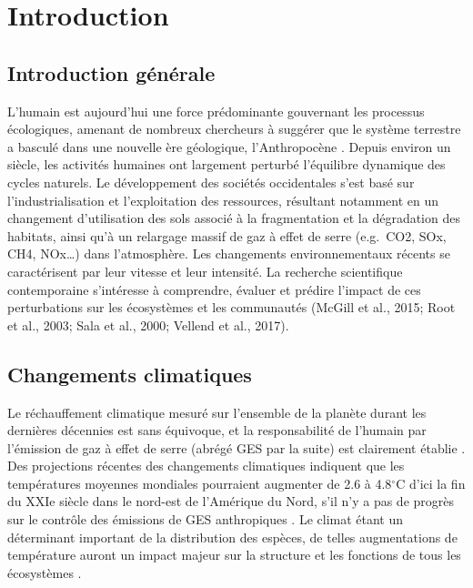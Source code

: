 \francais

\chapter*{Introduction}

\hypertarget{introduction-guxe9nuxe9rale}{%
\section{Introduction générale}\label{introduction-guxe9nuxe9rale}}

L'humain est aujourd'hui une force prédominante gouvernant les processus
écologiques, amenant de nombreux chercheurs à suggérer que le système
terrestre a basculé dans une nouvelle ère géologique, l'Anthropocène
\citep{crutzen_geology_2002}. Depuis environ un siècle, les activités
humaines ont largement perturbé l'équilibre dynamique des cycles
naturels. Le développement des sociétés occidentales s'est basé sur
l'industrialisation et l'exploitation des ressources, résultant
notamment en un changement d'utilisation des sols associé à la
fragmentation et la dégradation des habitats, ainsi qu'à un relargage
massif de gaz à effet de serre (e.g.~CO2, SOx, CH4, NOx\ldots) dans
l'atmosphère. Les changements environnementaux récents se caractérisent
par leur vitesse et leur intensité. La recherche scientifique
contemporaine s'intéresse à comprendre, évaluer et prédire l'impact de
ces perturbations sur les écosystèmes et les communautés (McGill et al.,
2015; Root et al., 2003; Sala et al., 2000; Vellend et al., 2017).

\hypertarget{changements-climatiques}{%
\section{Changements climatiques}\label{changements-climatiques}}

Le réchauffement climatique mesuré sur l'ensemble de la planète durant
les dernières décennies est sans équivoque, et la responsabilité de
l'humain par l'émission de gaz à effet de serre (abrégé GES par la
suite) est clairement établie \citep{ipcc_climate_2014}. Des projections
récentes des changements climatiques indiquent que les températures
moyennes mondiales pourraient augmenter de 2.6 à 4.8\(^{\circ}\)C d'ici
la fin du XXIe siècle dans le nord-est de l'Amérique du Nord, s'il n'y a
pas de progrès sur le contrôle des émissions de GES anthropiques
\citep{ipcc_climate_2014}. Le climat étant un déterminant important de
la distribution des espèces, de telles augmentations de température
auront un impact majeur sur la structure et les fonctions de tous les
écosystèmes \citep{bellard_impacts_2012, gauthier_vulnerability_2015}.

